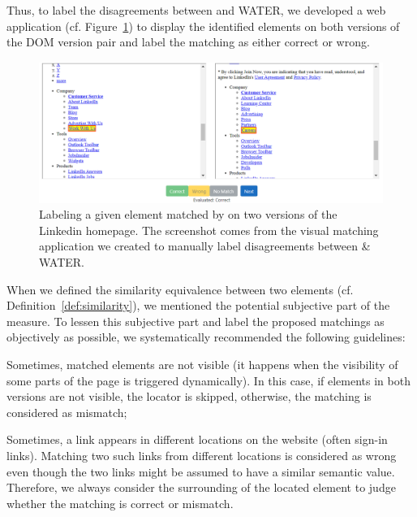 \documentclass[preprint, 12pt]{elsarticle}
\begin{document}
Thus, to label the disagreements between \erratum{} and WATER, we developed a web application (cf. Figure~\ref{fig:disagreement}) to display the identified elements on both versions of the DOM version pair and label the matching as either correct or wrong.

\begin{figure}
  \begin{center}
  \includegraphics[width=1.1\linewidth]{disagreement}
  \caption{Labeling a given element matched by \erratum{} on two versions of the \textsf{Linkedin} homepage. The screenshot comes from the visual matching application we created to manually label disagreements between \erratum{} \& WATER.}
  \label{fig:disagreement}
  \end{center}
\end{figure}

When we defined the similarity equivalence between two elements (cf. Definition~\ref{def:similarity}), we mentioned the potential subjective part of the measure.
To lessen this subjective part and label the proposed matchings as objectively as possible, we systematically recommended the following guidelines:
\begin{compactenum}
    \item Sometimes, matched elements are not visible (it happens when the visibility of some parts of the page is triggered dynamically).
    In this case, if elements in both versions are not visible, the locator is skipped, otherwise, the matching is considered as \textsf{mismatch};
    \item Sometimes, a link appears in different locations on the website (often sign-in links).
    Matching two such links from different locations is considered as wrong even though the two links might be assumed to have a similar semantic value.
    Therefore, we always consider the surrounding of the located element to judge whether the matching is \textsf{correct} or \textsf{mismatch}.
\end{compactenum}
\end{document}
